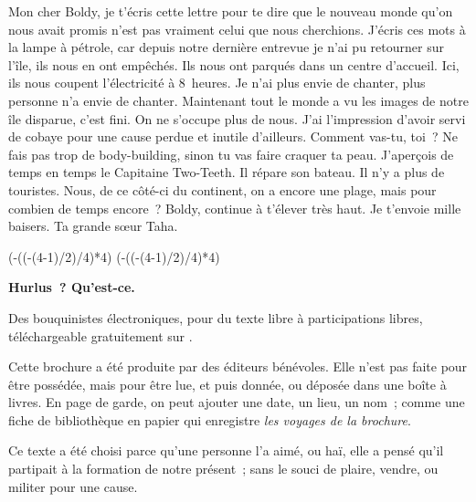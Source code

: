 \documentclass[french,twoside]{book} %
\newcommand{\dateline}[1]{\medskip{\RaggedLeft{#1}\par}\bigskip}
\def\truncdiv#1#2{((#1-(#2-1)/2)/#2)}
\def\moduloop#1#2{(#1-\truncdiv{#1}{#2}*#2)}
\def\modulo#1#2{\number\numexpr\moduloop{#1}{#2}\relax}
\begin{document}
\noindent Mon cher Boldy, je t’écris cette lettre pour te dire que le nouveau monde qu’on nous avait promis n’est pas vraiment celui que nous cherchions. J’écris ces mots à la lampe à pétrole, car depuis notre dernière entrevue je n’ai pu retourner sur l’île, ils nous en ont empêchés. Ils nous ont parqués dans un centre d’accueil. Ici, ils nous coupent l’électricité à 8 heures. Je n’ai plus envie de chanter, plus personne n’a envie de chanter. Maintenant tout le monde a vu les images de notre île disparue, c’est fini. On ne s’occupe plus de nous. J’ai l’impression d’avoir servi de cobaye pour une cause perdue et inutile d’ailleurs. Comment vas-tu, toi ? Ne fais pas trop de body-building, sinon tu vas faire craquer ta peau. J’aperçois de temps en temps le Capitaine Two-Teeth. Il répare son bateau. Il n’y a plus de touristes. Nous, de ce côté-ci du continent, on a encore une plage, mais pour combien de temps encore ? Boldy, continue à t’élever très haut. Je t’envoie mille baisers. Ta grande sœur Taha.\par

\dateline{Lille sept.oct. 2016}
 


\ifbooklet
  \pagestyle{empty}
  \clearpage
  \ifnum\modulo{\value{page}}{4}=0 \hbox{}\newpage\hbox{}\newpage\fi
  \ifnum\modulo{\value{page}}{4}=1 \hbox{}\newpage\hbox{}\newpage\fi


  \hbox{}\newpage
  \ifodd\value{page}\hbox{}\newpage\fi
  {\centering\color{rubric}\bfseries\noindent\large
    Hurlus ? Qu’est-ce.\par
    \bigskip
  }
  \noindent Des bouquinistes électroniques, pour du texte libre à participations libres,
  téléchargeable gratuitement sur \href{https://hurlus.fr}{}.\par
  \bigskip
  \noindent Cette brochure a été produite par des éditeurs bénévoles.
  Elle n’est pas faite pour être possédée, mais pour être lue, et puis donnée, ou déposée dans une boîte à livres.
  En page de garde, on peut ajouter une date, un lieu, un nom ;
  comme une fiche de bibliothèque en papier qui enregistre \emph{les voyages de la brochure}.
  \par

  Ce texte a été choisi parce qu’une personne l’a aimé,
  ou haï, elle a pensé qu’il partipait à la formation de notre présent ;
  sans le souci de plaire, vendre, ou militer pour une cause.
  \par
\end{document}

